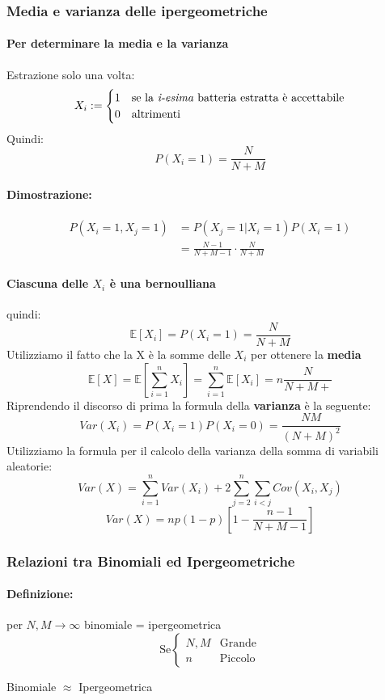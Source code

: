 \documentclass[]{article}
\newcommand{\ev}{\mathbb{E}[X]}
\renewcommand{\ev}[1]{\mathbb{E}[#1]}
\newcommand{\definizione}{\paragraph{Definizione:}}
\begin{document}
    \subsubsection{Media e varianza delle ipergeometriche}
    \paragraph{Per determinare la media e la varianza} Estrazione solo una volta:
    \begin{equation*}
        X_i :=
        \begin{cases}
            1 & \text{se la \textit{i-esima} batteria estratta è accettabile} \\
            0 & \text{altrimenti}
        \end{cases}
    \end{equation*}
    Quindi:
    \[ P(X_i = 1) = \frac{N}{N + M} \]
    \paragraph{Dimostrazione:} 
    \begin{equation*}
        \begin{split}
            P(X_i = 1, X_j = 1) &= P(X_j = 1 | X_i = 1) P(X_i = 1) \\
            & = \frac{N - 1}{N + M - 1} \cdot \frac{N}{N + M}
        \end{split}
    \end{equation*}
    \paragraph{Ciascuna delle $X_i$ è una bernoulliana} quindi:
    \[\ev{X_i} = P(X_i = 1) = \frac{N}{N + M}\]
    Utilizziamo il fatto che la X è la somme delle $X_i$ per ottenere la \textbf{media}
    \[ \ev{X} = \ev{\sum_{i = 1}^{n} X_i} = \sum_{i = 1}^{n} \ev{X_i} = n \frac{N}{N + M+}\]
    Riprendendo il discorso di prima la formula della \textbf{varianza} è la seguente:
    \[ Var(X_i) = P(X_i = 1) P(X_i = 0) = \frac{N M}{(N + M)^2}\]
    Utilizziamo la formula per il calcolo della varianza della somma di variabili aleatorie:
    \[ Var(X) = \sum_{i = 1}^{n} Var(X_i) + 2 \sum_{j = 2}^{n} \sum_{i < j}^{} Cov(X_i, X_j) \]  
    \[ Var(X) = np(1-p)[1 - \frac{n - 1}{N + M - 1}]\]

    \subsubsection{Relazioni tra Binomiali ed Ipergeometriche}
    \definizione per $N, M \longrightarrow \infty$ binomiale = ipergeometrica
    \begin{equation*}
        \text{Se}
        \begin{cases}
            N, M & \text{Grande} \\
            n & \text{Piccolo}
        \end{cases}
    \end{equation*}
    \centerline{Binomiale $\approx$ Ipergeometrica}
\end{document}
